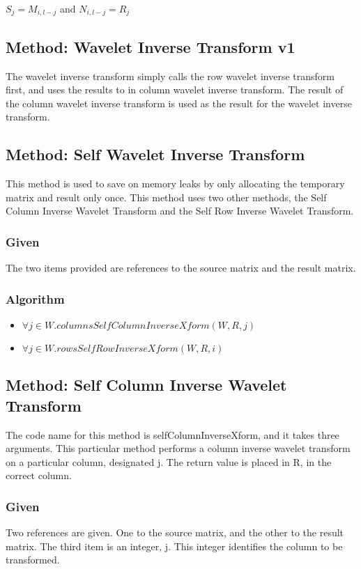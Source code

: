 $S_j = M_{i,l-j}$ and $N_{i,l-j} = R_j$

\bigskip

\subsection {Method: Wavelet Inverse Transform v1}
The wavelet inverse transform simply calls the row wavelet inverse transform first, and uses the results to in column wavelet inverse transform.  The result of the column wavelet inverse transform is used as the result for the wavelet inverse transform.  

\subsection {Method: Self Wavelet Inverse Transform }
This method is used to save on memory leaks by only allocating the temporary matrix and result only once.  This method uses two other methods, the Self Column Inverse Wavelet Transform and the Self Row Inverse Wavelet Transform.  

\subsubsection {Given}
The two items provided are references to the source matrix and the result matrix.

\subsubsection {Algorithm}
\begin{itemize}
\item $\forall j \in W.columns  SelfColumnInverseXform (W,R,j)$

\item $\forall j \in W.rows SelfRowInverseXform (W,R,i ) $
\end{itemize}

\subsection {Method: Self Column Inverse Wavelet Transform }
The code name for this method is selfColumnInverseXform, and it takes three arguments.  This particular method performs a column inverse wavelet transform on a particular column, designated j.  The return value is placed in R, in the correct column.  

\subsubsection {Given}
Two references are given.  One to the source matrix, and the other to the result matrix.  The third item is an integer, j.  This integer identifies the column to be transformed.


